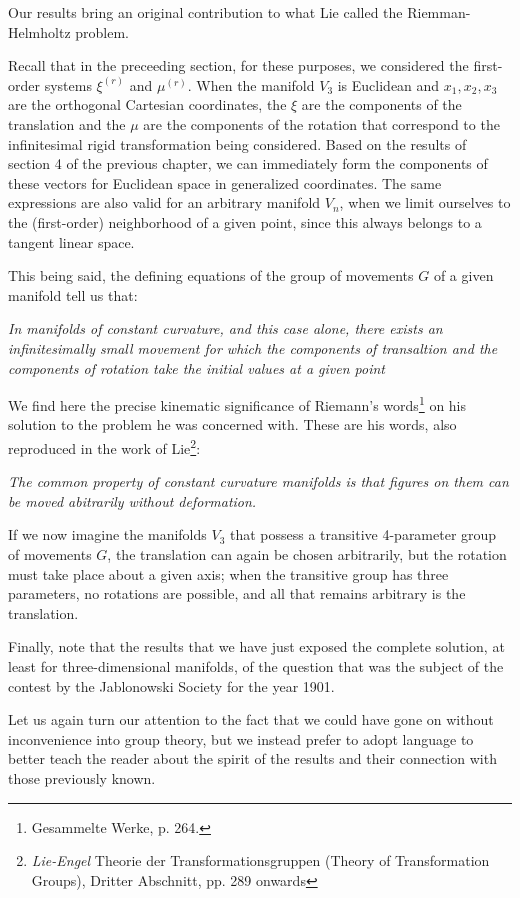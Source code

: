 \documentclass{book}
\begin{document}
Our results bring an original contribution to what Lie called the Riemman-Helmholtz problem. 

Recall that in the preceeding section, for these purposes, we considered the first-order systems $\xi^{(r)}$ and $\mu^{(r)}$. When the manifold $V_3$ is Euclidean and $x_1,x_2,x_3$ are the orthogonal Cartesian coordinates, the $\xi$ are the components of the translation and the $\mu$ are the components of the rotation that correspond to the infinitesimal rigid transformation being considered. Based on the results of section 4 of the previous chapter, we can immediately form the components of these vectors for Euclidean space in generalized coordinates. The same expressions are also valid for an arbitrary manifold $V_n$, when we limit ourselves to the (first-order) neighborhood of a given point, since this always belongs to a tangent linear space.

This being said, the defining equations of the group of movements $G$ of a given manifold tell us that:

\emph{In manifolds of constant curvature, and this case alone, there exists an infinitesimally small movement for which the components of transaltion and the components of rotation take the initial values at a given point}

We find here the precise kinematic significance of Riemann's words\footnote{Gesammelte Werke, p. 264.} on his solution to the problem he was concerned with. These are his words, also reproduced in the work of Lie\footnote{\emph{Lie-Engel} Theorie der Transformationsgruppen (Theory of Transformation Groups), Dritter Abschnitt, pp. 289 onwards}:

\emph{The common property of constant curvature manifolds is that figures on them can be moved abitrarily without deformation.}

If we now imagine the manifolds $V_3$ that possess a transitive 4-parameter group of movements $G$, the translation can again be chosen arbitrarily, but the rotation must take place about a given axis; when the transitive group has three parameters, no rotations are possible, and all that remains arbitrary is the translation. 

Finally, note that the results that we have just exposed the complete solution, at least for three-dimensional manifolds, of the question that was the subject of the contest by the Jablonowski Society for the year 1901.

Let us again turn our attention to the fact that we could have gone on without inconvenience into group theory, but we instead prefer to adopt language to better teach the reader about the spirit of the results and their connection with those previously known. 
\end{document}
